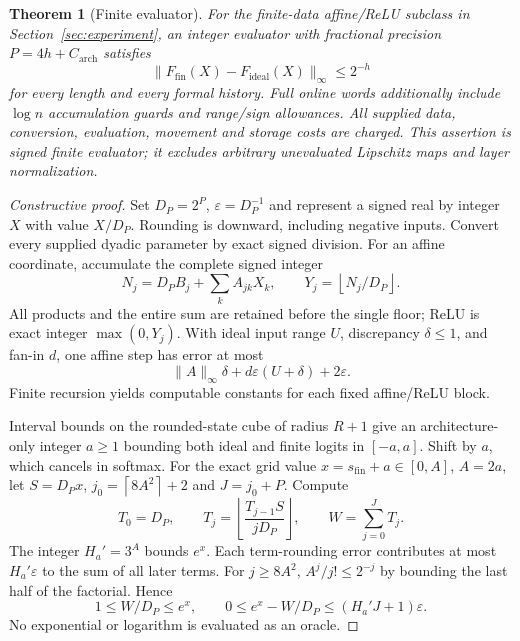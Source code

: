 \documentclass[11pt,letterpaper]{article}
\newtheorem{theorem}{Theorem}[section]
\theoremstyle{definition}\newtheorem{definition}[theorem]{Definition}
\theoremstyle{remark}\newtheorem{remark}[theorem]{Remark}
\newcommand{\floor}[1]{\left\lfloor #1\right\rfloor}
\newcommand{\ceil}[1]{\left\lceil #1\right\rceil}
\begin{document}
\begin{theorem}[Finite evaluator]\label{thm:arithmetic}
For the finite-data affine/ReLU subclass in Section~\ref{sec:experiment}, an integer evaluator with fractional precision $P=4h+C_{\mathrm{arch}}$ satisfies
\[
 \|F_{\mathrm{fin}}(X)-F_{\mathrm{ideal}}(X)\|_\infty\le2^{-h}
\]
for every length and every formal history. Full online words additionally include $\log n$ accumulation guards and range/sign allowances. All supplied data, conversion, evaluation, movement and storage costs are charged. This assertion is signed finite evaluator; it excludes arbitrary unevaluated Lipschitz maps and layer normalization.
\end{theorem}
\begin{proof}[Constructive proof]
Set $D_P=2^P$, $\varepsilon=D_P^{-1}$ and represent a signed real by integer $X$ with value $X/D_P$. Rounding is downward, including negative inputs. Convert every supplied dyadic parameter by exact signed division. For an affine coordinate, accumulate the complete signed integer
\[
 N_j=D_PB_j+\sum_k A_{jk}X_k,\qquad
 Y_j=\floor{N_j/D_P}.
\]
All products and the entire sum are retained before the single floor; ReLU is exact integer $\max(0,Y_j)$. With ideal input range $U$, discrepancy $\delta\le1$, and fan-in $d$, one affine step has error at most
\[
 \|A\|_\infty\delta+d\varepsilon(U+\delta)+2\varepsilon.
\]
Finite recursion yields computable constants for each fixed affine/ReLU block.

Interval bounds on the rounded-state cube of radius $R+1$ give an architecture-only integer $a\ge1$ bounding both ideal and finite logits in $[-a,a]$. Shift by $a$, which cancels in softmax. For the exact grid value $x=s_{\mathrm{fin}}+a\in[0,A]$, $A=2a$, let $S=D_Px$, $j_0=\ceil{8A^2}+2$ and $J=j_0+P$. Compute
\begin{equation}\label{eq:taylor}
 T_0=D_P,\qquad T_j=\floor{\frac{T_{j-1}S}{jD_P}},\qquad
 W=\sum_{j=0}^{J}T_j.
\end{equation}
The integer $H_a'=3^A$ bounds $e^x$. Each term-rounding error contributes at most $H_a'\varepsilon$ to the sum of all later terms. For $j\ge8A^2$, $A^j/j!\le2^{-j}$ by bounding the last half of the factorial. Hence
\begin{equation}\label{eq:exp}
 1\le W/D_P\le e^x,\qquad
 0\le e^x-W/D_P\le(H_a'J+1)\varepsilon.
\end{equation}
No exponential or logarithm is evaluated as an oracle.


\end{proof}
\end{document}
